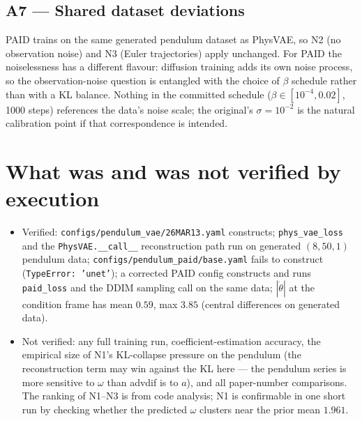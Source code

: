 \documentclass[11pt,a4paper]{article}
\newcommand{\code}[1]{\texttt{#1}}
\begin{document}
\subsection*{A7 --- Shared dataset deviations}

PAID trains on the same generated pendulum dataset as PhysVAE, so N2 (no
observation noise) and N3 (Euler trajectories) apply unchanged. For PAID the
noiselessness has a different flavour: diffusion training adds its own noise
process, so the observation-noise question is entangled with the choice of
$\beta$ schedule rather than with a KL balance. Nothing in the committed
schedule ($\beta \in [10^{-4}, 0.02]$, 1000 steps) references the data's
noise scale; the original's $\sigma = 10^{-2}$ is the natural calibration
point if that correspondence is intended.

\section{What was and was not verified by execution}

\begin{itemize}[nosep]
  \item Verified: \code{configs/pendulum\_vae/26MAR13.yaml} constructs;
        \code{phys\_vae\_loss} and the \code{PhysVAE.\_\_call\_\_} reconstruction
        path run on generated $(8, 50, 1)$ pendulum data;
        \code{configs/pendulum\_paid/base.yaml} fails to construct
        (\code{TypeError: 'unet'}); a corrected PAID config constructs and runs
        \code{paid\_loss} and the DDIM sampling call on the same data;
        $|\dot\theta|$ at the condition frame has mean $0.59$, max $3.85$
        (central differences on generated data).
  \item Not verified: any full training run, coefficient-estimation accuracy,
        the empirical size of N1's KL-collapse pressure on the pendulum
        (the reconstruction term may win against the KL here --- the pendulum
        series is more sensitive to $\omega$ than advdif is to $a$), and all
        paper-number comparisons. The ranking of N1--N3 is from code analysis;
        N1 is confirmable in one short run by checking whether the predicted
        $\omega$ clusters near the prior mean $1.961$.
\end{itemize}
\end{document}
